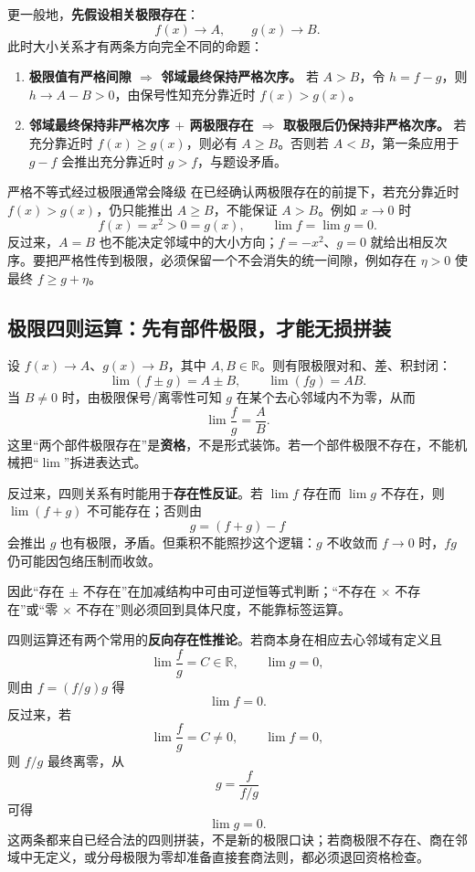 \documentclass[11pt,a4paper]{ctexart}
\newcommand{\kw}[1]{\textbf{\color{deep}#1}}
\begin{document}
更一般地，\textbf{先假设相关极限存在}：
\[
f(x)\to A,\qquad g(x)\to B.
\]
此时大小关系才有两条方向完全不同的命题：
\begin{enumerate}
  \item \textbf{极限值有严格间隙 $\Rightarrow$ 邻域最终保持严格次序。} 若 $A>B$，令 $h=f-g$，则 $h\to A-B>0$，由保号性知充分靠近时 $f(x)>g(x)$。
  \item \textbf{邻域最终保持非严格次序 $+$ 两极限存在 $\Rightarrow$ 取极限后仍保持非严格次序。} 若充分靠近时 $f(x)\ge g(x)$，则必有 $A\ge B$。否则若 $A<B$，第一条应用于 $g-f$ 会推出充分靠近时 $g>f$，与题设矛盾。
\end{enumerate}

\begin{warnbox}{严格不等式经过极限通常会降级}
在已经确认两极限存在的前提下，若充分靠近时 $f(x)>g(x)$，仍只能推出 $A\ge B$，不能保证 $A>B$。例如 $x\to0$ 时
\[
f(x)=x^2>0=g(x),
\qquad
\lim f=\lim g=0.
\]
反过来，$A=B$ 也不能决定邻域中的大小方向；$f=-x^2$、$g=0$ 就给出相反次序。要把严格性传到极限，必须保留一个不会消失的统一间隙，例如存在 $\eta>0$ 使最终 $f\ge g+\eta$。
\end{warnbox}

\subsection{极限四则运算：先有部件极限，才能无损拼装}

设 $f(x)\to A$、$g(x)\to B$，其中 $A,B\in\mathbb R$。则有限极限对和、差、积封闭：
\[
\lim(f\pm g)=A\pm B,
\qquad
\lim(fg)=AB.
\]
当 $B\ne0$ 时，由极限保号/离零性可知 $g$ 在某个去心邻域内不为零，从而
\[
\lim\frac{f}{g}=\frac AB.
\]
这里“两个部件极限存在”是\kw{资格}，不是形式装饰。若一个部件极限不存在，不能机械把“$\lim$”拆进表达式。

反过来，四则关系有时能用于\kw{存在性反证}。若 $\lim f$ 存在而 $\lim g$ 不存在，则 $\lim(f+g)$ 不可能存在；否则由
\[
g=(f+g)-f
\]
会推出 $g$ 也有极限，矛盾。但乘积不能照抄这个逻辑：$g$ 不收敛而 $f\to0$ 时，$fg$ 仍可能因包络压制而收敛。

因此“存在 $\pm$ 不存在”在加减结构中可由可逆恒等式判断；“不存在 $\times$ 不存在”或“零 $\times$ 不存在”则必须回到具体尺度，不能靠标签运算。

四则运算还有两个常用的\kw{反向存在性推论}。若商本身在相应去心邻域有定义且
\[
\lim\frac{f}{g}=C\in\mathbb R,
\qquad
\lim g=0,
\]
则由 $f=(f/g)g$ 得
\[
\lim f=0.
\]
反过来，若
\[
\lim\frac{f}{g}=C\ne0,
\qquad
\lim f=0,
\]
则 $f/g$ 最终离零，从
\[
g=\frac{f}{f/g}
\]
可得
\[
\lim g=0.
\]
这两条都来自已经合法的四则拼装，不是新的极限口诀；若商极限不存在、商在邻域中无定义，或分母极限为零却准备直接套商法则，都必须退回资格检查。
\end{document}
